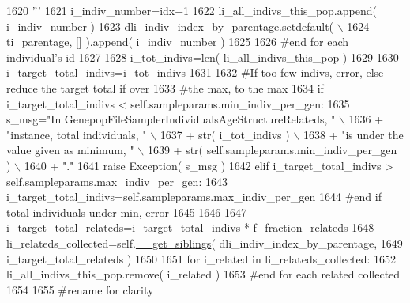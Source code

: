 \begin{DoxyCode}
1620 \textcolor{stringliteral}{                    '''}
1621                     i\_indiv\_number=idx+1
1622                     li\_all\_indivs\_this\_pop.append( i\_indiv\_number )
1623                     dli\_indiv\_index\_by\_parentage.setdefault( \(\backslash\)
1624                                 ti\_parentage, [] ).append( i\_indiv\_number ) 
1625 
1626                 \textcolor{comment}{#end for each individual's id   }
1627                 
1628                 i\_tot\_indivs=len( li\_all\_indivs\_this\_pop )
1629 
1630                 i\_target\_total\_indivs=i\_tot\_indivs
1631 
1632                 \textcolor{comment}{#If too few indivs, error, else reduce the target total if over}
1633                 \textcolor{comment}{#the max, to the max}
1634                 \textcolor{keywordflow}{if} i\_target\_total\_indivs < self.sampleparams.min\_indiv\_per\_gen:
1635                     s\_msg=\textcolor{stringliteral}{"In GenepopFileSamplerIndividualsAgeStructureRelateds, "} \(\backslash\)
1636                             + \textcolor{stringliteral}{"instance, total individuals, "} \(\backslash\)
1637                             + str( i\_tot\_indivs ) \(\backslash\)
1638                             + \textcolor{stringliteral}{"is under the value given as minimum, "} \(\backslash\)
1639                             + str( self.sampleparams.min\_indiv\_per\_gen ) \(\backslash\)
1640                             + \textcolor{stringliteral}{"."}
1641                     \textcolor{keywordflow}{raise} Exception( s\_msg )
1642                 \textcolor{keywordflow}{elif} i\_target\_total\_indivs > self.sampleparams.max\_indiv\_per\_gen:
1643                     i\_target\_total\_indivs=self.sampleparams.max\_indiv\_per\_gen
1644                 \textcolor{comment}{#end if total individuals under min, error}
1645 
1646 
1647                 i\_target\_total\_relateds=i\_target\_total\_indivs * f\_fraction\_relateds
1648                 li\_relateds\_collected=self.\hyperlink{classnegui_1_1genepopfilesampler_1_1GenepopFileSamplerIndividualsAgeStructureRelateds_af76a2ae0e6f84e4fe8bc8e5856e3a16b}{\_\_get\_siblings}( dli\_indiv\_index\_by\_parentage, 
1649                                                                     i\_target\_total\_relateds )
1650             
1651                 \textcolor{keywordflow}{for} i\_related \textcolor{keywordflow}{in} li\_relateds\_collected:
1652                     li\_all\_indivs\_this\_pop.remove( i\_related )
1653                 \textcolor{comment}{#end for each related collected}
1654 
1655                 \textcolor{comment}{#rename for clarity}

\end{DoxyCode}
